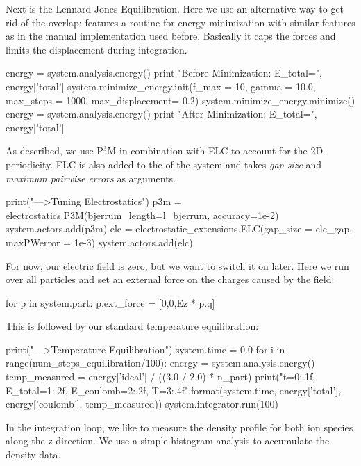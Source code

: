 \documentclass[
a4paper,                        %
11pt,                           %
twoside,                        %
footsepline,                    %
headsepline,                    %
headexclude,                    %
footexclude,                    %
pagesize,                       %
]{scrartcl}
\begin{document}
Next is the Lennard-Jones Equilibration. Here we use an alternative way to get rid of the overlap: \es features a routine for energy
minimization with similar features as in the manual implementation used before. Basically it 
caps the forces and limits the displacement during integration.

\begin{pypresso}
energy = system.analysis.energy()
print "Before Minimization: E_total=", energy['total']
system.minimize_energy.init(f_max = 10, gamma = 10.0, 
        max_steps = 1000, max_displacement= 0.2)
system.minimize_energy.minimize()
energy = system.analysis.energy()
print "After Minimization: E_total=", energy['total']
\end{pypresso}

As described, we use P$^3$M in combination with ELC to account for the 2D-periodicity. 
ELC is also added to the  of the system and takes \emph{gap size} and \emph{maximum
pairwise errors} as arguments.

\begin{pypresso}
print("\n--->Tuning Electrostatics")
p3m = electrostatics.P3M(bjerrum_length=l_bjerrum, 
        accuracy=1e-2)
system.actors.add(p3m)
elc = electrostatic_extensions.ELC(gap_size = elc_gap, 
        maxPWerror = 1e-3)
system.actors.add(elc)
\end{pypresso}

For now, our electric field is zero, but we want to switch it on later.
Here we run over all particles and set an external force on the charges caused 
by the field:

\begin{pypresso}
for p in system.part:
    p.ext_force = [0,0,Ez * p.q]
\end{pypresso}

This is followed by our standard temperature equilibration:

\begin{pypresso}
print("\n--->Temperature Equilibration")
system.time = 0.0
for i in range(num_steps_equilibration/100):
    energy = system.analysis.energy()
    temp_measured = energy['ideal'] / ((3.0 / 2.0) * n_part)
    print("t={0:.1f}, E_total={1:.2f}, E_coulomb={2:.2f},
          T={3:.4f}".format(system.time, energy['total'],
          energy['coulomb'], temp_measured))
    system.integrator.run(100)
\end{pypresso}

In the integration loop, we like to measure the density profile for both ion species along the z-direction.
We use a simple histogram analysis to accumulate the density data.
\end{document}
